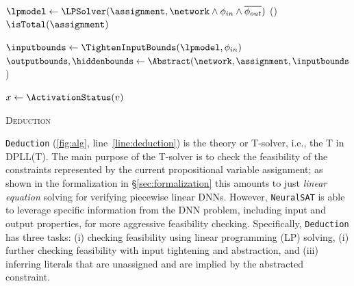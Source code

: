 \documentclass[oneside,11pt,dvipsnames]{book}
\numberwithin{equation}{section}
\theoremstyle{definition}
\theoremstyle{remark}
\newcommand{\tool}{\texttt{NeuralSAT}}
\begin{document}
\begin{algorithm}[t]
    \small


    \BlankLine

    $\lpmodel \leftarrow \LPSolver(\assignment, \network \land \phi_{in} \land \overline{\phi_{out}})$\;\label{line:lpsolver}
    \lIf{$\Solve(\lpmodel) \equiv \infeasible$}{\Return {\false}}\label{line:solve}
    \lIf(){$\isTotal(\assignment)$}{\Return {\true} }\label{line:full}


    $\inputbounds \leftarrow \TightenInputBounds(\lpmodel, \phi_{in})$\;\label{line:absstart}
    $\outputbounds, \hiddenbounds \leftarrow \Abstract(\network, \assignment, \inputbounds$)\;\label{line:abstraction}

    \label{line:checkfeasibility}

     {\label{line:infera}
      $x \leftarrow \ActivationStatus(v)$\;
        \label{line:inferb}
    }

    \Return {\true}\;\label{line:absend}

    \caption{\textsc{Deduction}}\label{alg:deduction}
\end{algorithm}

\texttt{Deduction} (\autoref{fig:alg}, line~\ref{line:deduction}) is the theory or T-solver, i.e., the T in DPLL(T). The main purpose of the T-solver is to check the feasibility of the constraints represented by the current propositional variable assignment; as shown in the formalization in \S\ref{sec:formalization} this amounts to just \emph{linear equation} solving for verifying piecewise linear DNNs. However, \tool{} is able to leverage specific information from the DNN problem, including input and output properties, for more aggressive feasibility checking.  Specifically, \texttt{Deduction} has three tasks: (i) checking feasibility using linear programming (LP) solving, (i) further checking feasibility with input tightening and abstraction, and (iii) inferring literals that are unassigned and are implied by the abstracted constraint.
\end{document}
